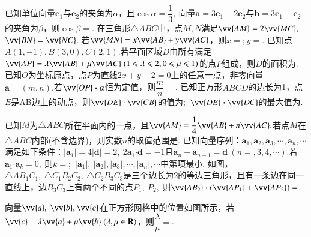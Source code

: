 \documentclass{BHCexam}
\begin{document}
\begin{questions}
\qs 已知单位向量$ \bm{e}_1\text{与}\bm{e}_2 $的夹角为$ \alpha $，且$ \cos \alpha =\dfrac{1}{3},~$向量$ \bm{a}=3\bm{e}_1-2\bm{e}_2 $与$ \bm{b}=3\bm{e}_1-\bm{e}_2 $的夹角为$ \beta $，则$ \cos \beta =$\tk.
\qs 在三角形$\triangle ABC$中，点$ M,N $满足$ \vv{AM}=2\vv{MC} ,~$$ \vv{BN}=\vv{NC} .~$若$ \vv{MN}=x\vv{AB}+y\vv{AC} $，则$ x= $\tk;$~ y= $\tk.
\qs 已知点$ A(1,-1) ,B(3,0),C(2,1).$若平面区域$ D $由所有满足$ \vv{AP}=\lambda \vv{AB}+\mu \vv{AC}~(1\le \lambda \le 2,0\le \mu \le 1) $的点$ P $组成，则$ D $的面积为\tk.
\qs 已知$ O $为坐标原点，点$ P $为直线$ 2x+y-2=0 $上的任意一点，非零向量$ \bm{a}=(m,n) .$若$ \vv{OP}\bm{\cdot a} $恒为定值，则$ \dfrac{m}{n}= $\tk.
\qs 已知正方形$ ABCD $的边长为1，点$ E $是AB边上的动点，则$ \vv{DE}\cdot \vv{CB} $的值为\tk;~$ \vv{DE}\bm\cdot \vv{DC} $的最大值为\tk.

\qs 已知$ M $为$\triangle ABC$所在平面内的一点，且$ \vv{AM}=\dfrac{1}{4}\vv{AB}+n\vv{AC}. $若点$ M $在$\triangle ABC$内部(不含边界)，则实数$ n $的取值范围是\tk. 
\qs 已知向量序列：$ \bm{a}_1,\bm{a}_2,\bm{a}_3,\cdots,\bm{a}_n,\cdots $满足如下条件：$ \left|\bm{a}_1\right|=4\left|\bm{d}\right|=2,~2\bm{a}_1\bm\cdot \bm{d}=-1 $且$ \bm{a}_n-\bm{a}_{n-1}=
\bm{d}~(n=,3,4,\cdots). $若$ \bm{a}_1\bm{\cdot}\bm{a}_k=0,~ $则$ k= $\tk;~$ \left|\bm{a}_1\right|,~  \left|\bm{a}_2\right|, \left|\bm{a}_3\right|,\cdots, \left|\bm{a}_n\right|,\cdots$中第\tk 项最小.
\qs 如图，$ \triangle AB_1C_1,~\triangle C_1B_2C_2,~\triangle C_2B_3C_3 $是三个边长为2的等边三角形，且有一条边在同一直线上，边$ B_3C_3 $上有两个不同的点$ P_1,~P_2,~ $则$ \vv{AB_2}\bm{\cdot}(\vv{AP_1}+\vv{AP_2}) =$\tk.
\begin{center}
\end{center}

\qs 向量$ \vv{a},~\vv{b},\vv{c} $在正方形网格中的位置如图所示，若$ \vv{c}=\lambda\vv{a}+\mu\vv{b}~(\lambda,\mu \in \mathbf{R}) $，则$ \dfrac{\lambda}{\mu}=$\tk.
\begin{center}
\end{center}
\end{questions}
\end{document}
